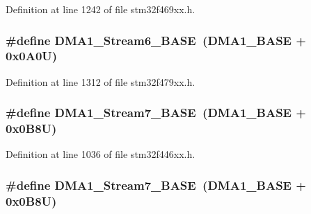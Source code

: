 Definition at line 1242 of file stm32f469xx.\+h.

\subsubsection[{\texorpdfstring{D\+M\+A1\+\_\+\+Stream6\+\_\+\+B\+A\+SE}{DMA1_Stream6_BASE}}]{\setlength{\rightskip}{0pt plus 5cm}\#define D\+M\+A1\+\_\+\+Stream6\+\_\+\+B\+A\+SE~({\bf D\+M\+A1\+\_\+\+B\+A\+SE} + 0x0\+A0\+U)}\hypertarget{group___peripheral__memory__map_ga58998ddc40adb6361704d6c9dad08125}{}\label{group___peripheral__memory__map_ga58998ddc40adb6361704d6c9dad08125}


Definition at line 1312 of file stm32f479xx.\+h.

\subsubsection[{\texorpdfstring{D\+M\+A1\+\_\+\+Stream7\+\_\+\+B\+A\+SE}{DMA1_Stream7_BASE}}]{\setlength{\rightskip}{0pt plus 5cm}\#define D\+M\+A1\+\_\+\+Stream7\+\_\+\+B\+A\+SE~({\bf D\+M\+A1\+\_\+\+B\+A\+SE} + 0x0\+B8\+U)}\hypertarget{group___peripheral__memory__map_ga82186dd6d3f60995d428b34c041919d7}{}\label{group___peripheral__memory__map_ga82186dd6d3f60995d428b34c041919d7}


Definition at line 1036 of file stm32f446xx.\+h.

\subsubsection[{\texorpdfstring{D\+M\+A1\+\_\+\+Stream7\+\_\+\+B\+A\+SE}{DMA1_Stream7_BASE}}]{\setlength{\rightskip}{0pt plus 5cm}\#define D\+M\+A1\+\_\+\+Stream7\+\_\+\+B\+A\+SE~({\bf D\+M\+A1\+\_\+\+B\+A\+SE} + 0x0\+B8\+U)}\hypertarget{group___peripheral__memory__map_ga82186dd6d3f60995d428b34c041919d7}{}\label{group___peripheral__memory__map_ga82186dd6d3f60995d428b34c041919d7}


